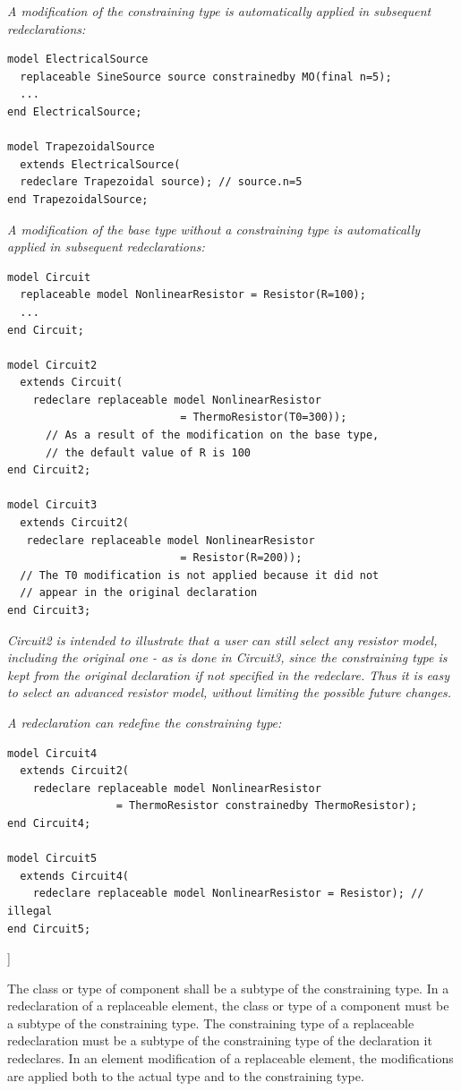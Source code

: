 \documentclass[10pt,a4paper]{report}
\begin{document}
\emph{A modification of the constraining type is automatically applied
in subsequent redeclarations:}
\begin{lstlisting}[language=modelica]
model ElectricalSource
  replaceable SineSource source constrainedby MO(final n=5);
  ...
end ElectricalSource;

model TrapezoidalSource
  extends ElectricalSource(
  redeclare Trapezoidal source); // source.n=5
end TrapezoidalSource;
\end{lstlisting}

\emph{A modification of the base type without a constraining type is
automatically applied in subsequent redeclarations:}
\begin{lstlisting}[language=modelica]
model Circuit
  replaceable model NonlinearResistor = Resistor(R=100);
  ...
end Circuit;

model Circuit2
  extends Circuit(
    redeclare replaceable model NonlinearResistor
                           = ThermoResistor(T0=300));
      // As a result of the modification on the base type,
      // the default value of R is 100
end Circuit2;

model Circuit3
  extends Circuit2(
   redeclare replaceable model NonlinearResistor
                           = Resistor(R=200));
  // The T0 modification is not applied because it did not
  // appear in the original declaration
end Circuit3;
\end{lstlisting}

\emph{Circuit2 is intended to illustrate that a user can still select
any resistor model, including the original one - as is done in Circuit3,
since the constraining type is kept from the original declaration if not
specified in the redeclare. Thus it is easy to select an advanced
resistor model, without limiting the possible future changes. }

\emph{A redeclaration can redefine the constraining type:}
\begin{lstlisting}[language=modelica]
model Circuit4
  extends Circuit2(
    redeclare replaceable model NonlinearResistor
                 = ThermoResistor constrainedby ThermoResistor);
end Circuit4;

model Circuit5
  extends Circuit4(
    redeclare replaceable model NonlinearResistor = Resistor); // illegal
end Circuit5;
\end{lstlisting}

{]}

The class or type of component shall be a subtype of the constraining
type. In a redeclaration of a replaceable element, the class or type of
a component must be a subtype of the constraining type. The constraining
type of a replaceable redeclaration must be a subtype of the
constraining type of the declaration it redeclares. In an element
modification of a replaceable element, the modifications are applied
both to the actual type and to the constraining type.
\end{document}
